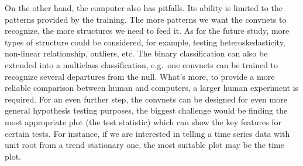 \documentclass[12pt]{article}
\begin{document}
On the other hand, the computer also has pitfalls. Its ability is
limited to the patterns provided by the training. The more patterns we
want the convnets to recognize, the more structures we need to feed it.
As for the future study, more types of structure could be considered,
for example, testing heteroskedasticity, non-linear relationship,
outliers, etc. The binary classification can also be extended into a
multiclass classification, e.g.~one convnets can be trained to recognize
several departures from the null. What's more, to provide a more
reliable comparison between human and computers, a larger human
experiment is required. For an even further step, the convnets can be
designed for even more general hypothesis testing purposes, the biggest
challenge would be finding the most appropriate plot (the test
statistic) which can show the key features for certain tests. For
instance, if we are interested in telling a time series data with unit
root from a trend stationary one, the most suitable plot may be the time
plot.



\end{document}
